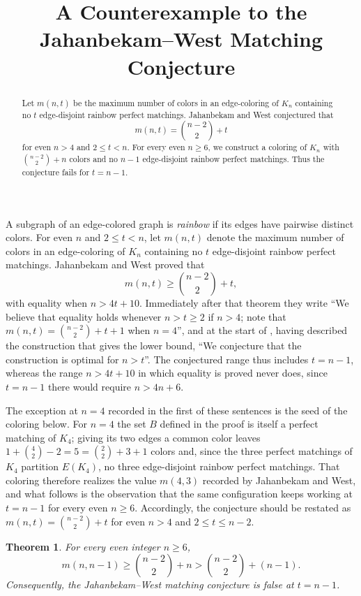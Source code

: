 \documentclass[11pt]{amsart}
\title[Counterexample to the Jahanbekam--West conjecture]
{A Counterexample to the Jahanbekam--West Matching Conjecture}
\date{}
\newtheorem{theorem}{Theorem}
\theoremstyle{remark}
\begin{document}
\raggedbottom

\begin{abstract}
Let $m(n,t)$ be the maximum number of colors in an edge-coloring of $K_n$
containing no $t$ edge-disjoint rainbow perfect matchings. Jahanbekam and
West conjectured that
\[
  m(n,t)=\binom{n-2}{2}+t
\]
for even $n>4$ and $2\le t<n$. For every even $n\ge6$, we construct a
coloring of $K_n$ with $\binom{n-2}{2}+n$ colors and no $n-1$
edge-disjoint rainbow perfect matchings. Thus the conjecture fails for
$t=n-1$.
\end{abstract}

\maketitle

A subgraph of an edge-colored graph is \emph{rainbow} if its edges have
pairwise distinct colors. For even $n$ and $2\le t<n$, let $m(n,t)$ denote
the maximum number of colors in an edge-coloring of $K_n$ containing no
$t$ edge-disjoint rainbow perfect matchings. Jahanbekam and West
\cite[Theorem~1.1]{JW} proved that
\[
  m(n,t)\ge \binom{n-2}{2}+t,
\]
with equality when $n>4t+10$. Immediately after that theorem they write
``We believe that equality holds whenever $n>t\ge2$ if $n>4$; note that
$m(n,t)=\binom{n-2}{2}+t+1$ when $n=4$'', and at the start of
\cite[Section~4]{JW}, having described the construction that gives the
lower bound, ``We conjecture that the construction is optimal for
$n>t$''. The conjectured range thus includes $t=n-1$, whereas the range
$n>4t+10$ in which equality is proved never does, since $t=n-1$ there
would require $n>4n+6$.

The exception at $n=4$ recorded in the first of these sentences is the
seed of the coloring below. For $n=4$ the set $B$ defined in the proof is
itself a perfect matching of $K_4$; giving its two edges a common color
leaves $1+\binom{4}{2}-2=5=\binom{2}{2}+3+1$ colors and, since the three
perfect matchings of $K_4$ partition $E(K_4)$, no three edge-disjoint
rainbow perfect matchings. That coloring therefore realizes the value $m(4,3)$
recorded by Jahanbekam and West, and what follows is the observation that
the same configuration keeps working at $t=n-1$ for every even $n\ge6$.
Accordingly, the conjecture should be restated as
$m(n,t)=\binom{n-2}{2}+t$ for even $n>4$ and $2\le t\le n-2$.

\begin{theorem}
For every even integer $n\ge6$,
\[
  m(n,n-1)\ge \binom{n-2}{2}+n
  >\binom{n-2}{2}+(n-1).
\]
Consequently, the Jahanbekam--West matching conjecture is false at
$t=n-1$.
\end{theorem}
\end{document}
